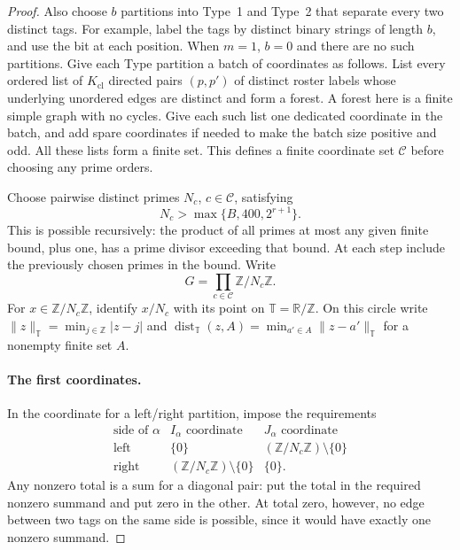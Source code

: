\begin{proof}
Also choose $b$ partitions into Type~1 and Type~2 that separate every
two distinct tags.  For example, label the tags by distinct binary
strings of length $b$, and use the bit at each position.  When $m=1$,
$b=0$ and there are no such partitions.
Give each Type partition a batch of coordinates as follows.  List every
ordered list of $K_{\mathrm{cl}}$ directed pairs $(p,p')$ of distinct
roster labels whose underlying unordered edges are distinct and form a
forest.  A forest here is a finite simple graph with no cycles.  Give
each such list one dedicated coordinate in the batch, and add spare
coordinates if needed to make the batch size positive and odd.  All
these lists form a finite set.  This defines a finite coordinate set
$\mathcal C$ before choosing any prime orders.

Choose pairwise distinct primes $N_c$, $c\in\mathcal C$, satisfying
\begin{equation}
 N_c>\max\{B,400,2^{r+1}\}.
 \label{eq:clock-prime-threshold}
\end{equation}
This is possible recursively: the product of all primes at most any
given finite bound, plus one, has a prime divisor exceeding that bound.
At each step include the previously chosen primes in the bound.
Write
\[
 G=\prod_{c\in\mathcal C}\mathbb Z/N_c\mathbb Z.
\]
For $x\in\mathbb Z/N_c\mathbb Z$, identify $x/N_c$ with its point on
$\mathbb T=\mathbb R/\mathbb Z$.  On this circle write
$\|z\|_{\mathbb T}=\min_{j\in\mathbb Z}|z-j|$ and
$\operatorname{dist}_{\mathbb T}(z,A)
=\min_{a'\in A}\|z-a'\|_{\mathbb T}$ for a nonempty finite set $A$.

\paragraph{The first coordinates.}
In the coordinate for a left/right partition, impose the requirements
\[
\begin{array}{c|cc}
 \text{side of }\alpha & I_\alpha\text{ coordinate}
                         &J_\alpha\text{ coordinate}\\ \hline
 \text{left} &\{0\}&(\mathbb Z/N_c\mathbb Z)\setminus\{0\}\\
 \text{right}&(\mathbb Z/N_c\mathbb Z)\setminus\{0\}&\{0\}.
\end{array}
\]
Any nonzero total is a sum for a diagonal pair: put the total in the
required nonzero summand and put zero in the other.  At total zero,
however, no edge between two tags on the same side is possible, since
it would have exactly one nonzero summand.


\end{proof}
